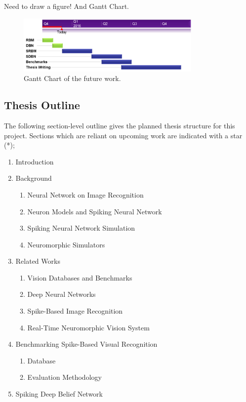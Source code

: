 \documentclass[journal]{journal}
\begin{document}
	Need to draw a figure!
	And Gantt Chart.
		\begin{figure}[hbt]
			\centering
			\includegraphics[width=0.8\textwidth]{images/gantt.png}
			\caption{Gantt Chart of the future work.}
			\label{fig:gannt}
		\end{figure}
\begin{appendices}
	\section{Thesis Outline}
	\label{app:thesis}
	The following section-level outline gives the planned thesis structure for this project.
	Sections which are reliant on upcoming work are indicated with a star (*);
	\begin{enumerate}
		\item Introduction
		\item Background
			\begin{enumerate}
				\item Neural Network on Image Recognition
				\item Neuron Models and Spiking Neural Network
				\item Spiking Neural Network Simulation
				\item Neuromorphic Simulators
			\end{enumerate}	
		\item Related Works
			\begin{enumerate}
				\item Vision Databases and Benchmarks
				\item Deep Neural Networks
				\item Spike-Based Image Recognition
				\item Real-Time Neuromorphic Vision System
			\end{enumerate}
		\item Benchmarking Spike-Based Visual Recognition
			\begin{enumerate}
				\item Database
				\item Evaluation Methodology
			\end{enumerate}
		\item Spiking Deep Belief Network

\end{enumerate}
\end{appendices}
\end{document}
